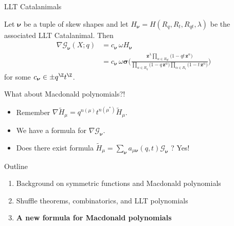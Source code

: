 \documentclass[dvipsnames,handout]{beamer}
\newcommand{\zz}{{\boldsymbol z}}
\newcommand{\sigmabold}{\boldsymbol \sigma}
\newcommand{\Htild}{\tilde{H}}
\newcommand{\Gcal}{{\mathcal G}}
\newcommand{\nubold}{{\boldsymbol \nu }}
\theoremstyle{definition}
\newcounter{c}
\begin{document}
\begin{frame}{LLT Catalanimals}
\begin{theorem}
Let  $\nubold$ be a tuple of skew shapes 
and let $H_{\nubold} = H(R_q,R_t,R_{qt}, \lambda)$ be the associated LLT Catalanimal. Then
 \vspace{-2mm}
\begin{align*}
\nabla \Gcal_{\nubold}(X;q)
& = c_\nubold\,\omega H_{\nubold}
\\
& = c_\nubold  \, \omega \sigmabold
 \bigg(\frac{\zz ^\lambda \prod_{\alpha \in
R_{qt}} \big(1-q t\, \zz ^\alpha \big)} {\prod_{\alpha \in R_q} \big(1-q \, \zz ^\alpha\big)
\prod_{\alpha \in R_t} \big(1-t \, \zz ^\alpha\big)}\bigg)
\end{align*}
for some $c_\nubold \in \pm q^\Z t^{\Z}$.
\end{theorem}
\end{frame}
  \begin{frame}{What about Macdonald polynomials?!}
    \begin{itemize}
    \item Remember \(\nabla \Htild_\mu = q^{n(\mu)} t^{n(\mu^*)} \Htild_\mu\). \pause
    \item We have a formula for \(\nabla \Gcal_\nubold\). \pause
    \item Does there exist formula \(\Htild_\mu = \sum_\nubold a_{\mu
        \nubold}(q,t) \Gcal_\nubold\) ? \pause Yes!
    \end{itemize}
  \end{frame}
\begin{frame}{Outline}
  \begin{enumerate}
  \item Background on symmetric functions and Macdonald polynomials
  \item Shuffle theorems, combinatorics, and LLT polynomials
  \item {\bf A new formula for Macdonald polynomials}
  \end{enumerate}
\end{frame}
\end{document}
